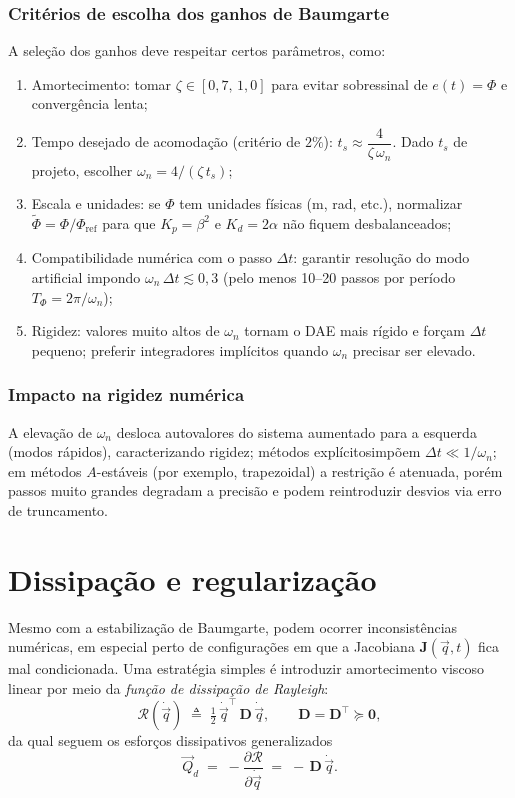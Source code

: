\subsubsection{Critérios de escolha dos ganhos de Baumgarte}
A seleção dos ganhos deve respeitar certos parâmetros, como:
\begin{enumerate}[label=(\roman*)]
\item Amortecimento: tomar $\zeta \in [0{,}7,\,1{,}0]$ para evitar sobressinal de $e(t)=\Phi$ e convergência lenta;
\item Tempo desejado de acomodação (critério de $2\%$): $t_s \approx \dfrac{4}{\zeta\,\omega_n}$.
Dado $t_s$ de projeto, escolher $\omega_n = 4/(\zeta\,t_s)$;
\item Escala e unidades: se $\Phi$ tem unidades físicas (m, rad, etc.), normalizar
$\tilde{\Phi}=\Phi/\Phi_{\mathrm{ref}}$ para que $K_p=\beta^2$ e $K_d=2\alpha$ não fiquem desbalanceados;
\item Compatibilidade numérica com o passo $\Delta t$: garantir resolução do modo artificial impondo
$\omega_n\,\Delta t \lesssim 0{,}3$ (pelo menos 10–20 passos por período $T_\Phi=2\pi/\omega_n$);
\item Rigidez: valores muito altos de $\omega_n$ tornam o DAE mais rígido e forçam $\Delta t$ pequeno; preferir integradores implícitos quando $\omega_n$ precisar ser elevado.
\end{enumerate}

\subsubsection{Impacto na rigidez numérica}
A elevação de $\omega_n$ desloca autovalores do sistema aumentado para a esquerda (modos rápidos), caracterizando rigidez;
métodos explícitosimpõem $\Delta t \ll 1/\omega_n$; em métodos $A$-estáveis (por exemplo, trapezoidal) a restrição é atenuada, porém passos muito grandes degradam a precisão e podem reintroduzir desvios via erro de truncamento.

\section{Dissipação e regularização}
Mesmo com a estabilização de Baumgarte, podem ocorrer inconsistências numéricas, em especial perto de configurações em que a Jacobiana $\mathbf J(\vec q,t)$ fica mal condicionada. Uma estratégia simples é introduzir amortecimento viscoso linear por meio da \emph{função de dissipação de Rayleigh}:
\begin{equation}
\mathcal R(\dot{\vec q}) \;\triangleq\; \tfrac{1}{2}\,\dot{\vec q}^{\top}\,\mathbf D\,\dot{\vec q},
\qquad \mathbf D=\mathbf D^{\top}\succeq \mathbf 0,
\label{eq:Rayleigh}
\end{equation}
da qual seguem os esforços dissipativos generalizados
\begin{equation}
\vec Q_{\!d} \;=\; -\frac{\partial \mathcal R}{\partial \dot{\vec q}}
\;=\; -\,\mathbf D\,\dot{\vec q}.
\label{eq:Qd}
\end{equation}

